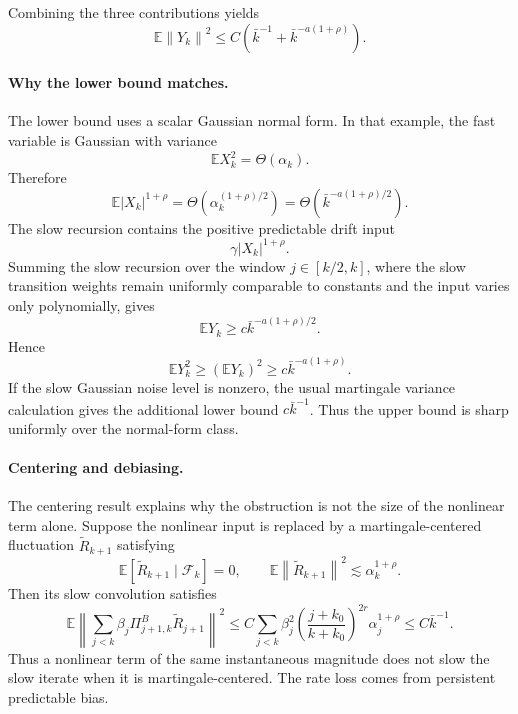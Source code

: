 \documentclass{article}
\newcommand{\E}{\mathbb{E}}
\newcommand{\norm}[1]{\left\lVert #1\right\rVert}
\begin{document}
Combining the three contributions yields
\[
  \E\norm{Y_k}^2
  \le
  C\left(\bar k^{-1}+\bar k^{-a(1+\rho)}\right).
\]

\paragraph{Why the lower bound matches.}
The lower bound uses a scalar Gaussian normal form. In that example, the fast variable is Gaussian with variance
\[
  \E X_k^2=\Theta(\alpha_k).
\]
Therefore
\[
  \E |X_k|^{1+\rho}
  =
  \Theta\!\left(\alpha_k^{(1+\rho)/2}\right)
  =
  \Theta\!\left(\bar k^{-a(1+\rho)/2}\right).
\]
The slow recursion contains the positive predictable drift input
\[
  \gamma |X_k|^{1+\rho}.
\]
Summing the slow recursion over the window $j\in[k/2,k]$, where the slow transition weights remain uniformly comparable to constants and the input varies only polynomially, gives
\[
  \E Y_k
  \ge
  c\bar k^{-a(1+\rho)/2}.
\]
Hence
\[
  \E Y_k^2
  \ge
  (\E Y_k)^2
  \ge
  c\bar k^{-a(1+\rho)}.
\]
If the slow Gaussian noise level is nonzero, the usual martingale variance calculation gives the additional lower bound $c\bar k^{-1}$. Thus the upper bound is sharp uniformly over the normal-form class.

\paragraph{Centering and debiasing.}
The centering result explains why the obstruction is not the size of the nonlinear term alone. Suppose the nonlinear input is replaced by a martingale-centered fluctuation $\widetilde R_{k+1}$ satisfying
\[
  \E[\widetilde R_{k+1}\mid\mathcal F_k]=0,
  \qquad
  \E\norm{\widetilde R_{k+1}}^2
  \lesssim
  \alpha_k^{1+\rho}.
\]
Then its slow convolution satisfies
\[
  \E\left\|
  \sum_{j<k}\beta_j\Pi^B_{j+1,k}\widetilde R_{j+1}
  \right\|^2
  \le
  C\sum_{j<k}\beta_j^2
  \left(\frac{j+k_0}{k+k_0}\right)^{2r}
  \alpha_j^{1+\rho}
  \le
  C\bar k^{-1}.
\]
Thus a nonlinear term of the same instantaneous magnitude does not slow the slow iterate when it is martingale-centered. The rate loss comes from persistent predictable bias.
\end{document}
